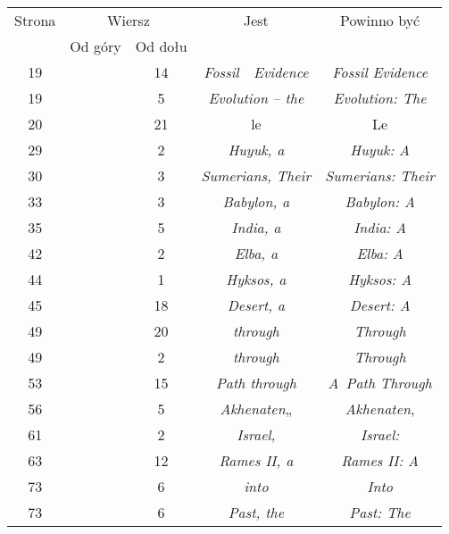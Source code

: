 \documentclass[a4paper,11pt]{article}
\numberwithin{equation}{section}
\begin{document}
\begin{center}

  \begin{tabular}{|c|c|c|c|c|}
    \hline
    Strona & \multicolumn{2}{c|}{Wiersz} & Jest
                              & Powinno być \\ \cline{2-3}
    & Od góry & Od dołu & & \\
    \hline
    \hphantom{0}19 & & 14 & \textit{Fossil~~Evidence}
    & \textit{Fossil Evidence} \\
    \hphantom{0}19 & & \hphantom{0}5 & \textit{Evolution -- the}
    & \textit{Evolution: The} \\
    \hphantom{0}20 & & 21 & le & Le \\
    \hphantom{0}29 & & \hphantom{0}2 & \textit{Huyuk, a}
    & \textit{Huyuk: A} \\
    \hphantom{0}30 & & \hphantom{0}3 & \textit{Sumerians, Their}
    & \textit{Sumerians: Their} \\
    \hphantom{0}33 & & \hphantom{0}3 & \textit{Babylon, a}
    & \textit{Babylon: A} \\
    \hphantom{0}35 & & \hphantom{0}5 & \textit{India, a}
    & \textit{India: A} \\
    \hphantom{0}42 & & \hphantom{0}2 & \textit{Elba, a}
    & \textit{Elba: A} \\
    \hphantom{0}44 & & \hphantom{0}1 & \textit{Hyksos, a}
    & \textit{Hyksos: A} \\
    \hphantom{0}45 & & 18 & \textit{Desert, a} & \textit{Desert: A} \\
    \hphantom{0}49 & & 20 & \textit{through} & \textit{Through} \\
    \hphantom{0}49 & & \hphantom{0}2 & \textit{through}
    & \textit{Through} \\
    \hphantom{0}53 & & 15 & \textit{Path through}
    & \textit{A~Path Through} \\
    \hphantom{0}56 & & \hphantom{0}5 & \textit{Akhenaten}„
           & \textit{Akhenaten}, \\
    \hphantom{0}61 & & \hphantom{0}2 & \textit{Israel,}
    & \textit{Israel:} \\
    \hphantom{0}63 & & 12 & \textit{Rames II, a} & \textit{Rames II: A} \\
    \hphantom{0}73 & & \hphantom{0}6 & \textit{into} & \textit{Into} \\
    \hphantom{0}73 & & \hphantom{0}6 & \textit{Past, the}
    & \textit{Past: The} \\

\end{tabular}
\end{center}
\end{document}
